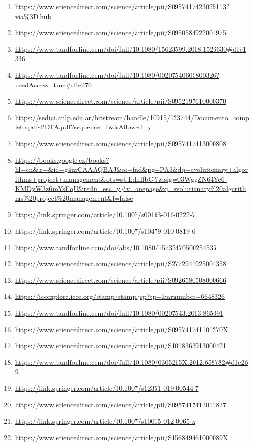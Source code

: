 \documentclass[a4paper,12pt]{article}
\begin{document}
\begin{enumerate}
  \item \url{https://www.sciencedirect.com/science/article/pii/S0957417423025113?via%3Dihub}
  \item \url{https://www.sciencedirect.com/science/article/pii/S0950584922001975}
  \item \url{https://www.tandfonline.com/doi/full/10.1080/15623599.2018.1526630#d1e1336}
  \item \url{https://www.tandfonline.com/doi/full/10.1080/00207540600800326?needAccess=true#d1e276}
  \item \url{https://www.sciencedirect.com/science/article/pii/S0952197610000370}
  \item \url{https://sedici.unlp.edu.ar/bitstream/handle/10915/123744/Documento_completo.pdf-PDFA.pdf?sequence=1&isAllowed=y}
  \item \url{https://www.sciencedirect.com/science/article/pii/S0957417413000808}
  \item \url{https://books.google.cz/books?hl=en&lr=&id=g4urCAAAQBAJ&oi=fnd&pg=PA3&dq=evolutionary+algorithms+project+management&ots=sULdhIfbGY&sig=03WggZN64Ye6-KMDyW3z6mYsFqU&redir_esc=y#v=onepage&q=evolutionary%20algorithms%20project%20management&f=false}
  \item \url{https://link.springer.com/article/10.1007/s00163-016-0222-7}
  \item \url{https://link.springer.com/article/10.1007/s10479-010-0819-6}
  \item \url{https://www.tandfonline.com/doi/abs/10.1080/15732470500254535}
  \item \url{https://www.sciencedirect.com/science/article/pii/S2772941925001358}
  \item \url{https://www.sciencedirect.com/science/article/pii/S0926580508000666}
  \item \url{https://ieeexplore.ieee.org/stamp/stamp.jsp?tp=&arnumber=6648326}
  \item \url{https://www.tandfonline.com/doi/full/10.1080/00207543.2013.865091}
  \item \url{https://www.sciencedirect.com/science/article/pii/S095741741101270X}
  \item \url{https://www.sciencedirect.com/science/article/pii/S1018363913000421}
  \item \url{https://www.tandfonline.com/doi/full/10.1080/0305215X.2012.658782#d1e269}
  \item \url{https://link.springer.com/article/10.1007/s12351-019-00544-7}
  \item \url{https://www.sciencedirect.com/science/article/pii/S0957417412011827}
  \item \url{https://link.springer.com/article/10.1007/s10015-012-0065-x}
  \item \url{https://www.sciencedirect.com/science/article/pii/S156849461000089X}
\end{enumerate}



\end{document}
